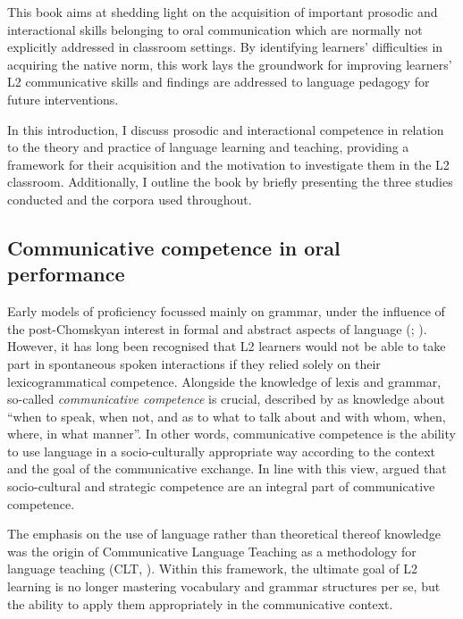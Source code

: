 This book aims at shedding light on the acquisition of important prosodic and interactional skills belonging to oral communication which are normally not explicitly addressed in classroom settings. By identifying learners’ difficulties in acquiring the native norm, this work lays the groundwork for improving learners’ L2 communicative skills and findings are addressed to language pedagogy for future interventions.

In this introduction, I discuss prosodic and interactional competence in relation to the theory and practice of language learning and teaching, providing a framework for their acquisition and the motivation to investigate them in the L2 classroom. Additionally, I outline the book by briefly presenting the three studies conducted and the corpora used throughout.

\subsection{Communicative competence in oral performance}
\hypertarget{Toc191305873}{}
Early models of proficiency focussed mainly on grammar, under the influence of the post-Chomskyan interest in formal and abstract aspects of language (\citealt{Campbell-Larsen2015}; \citealt{Kramsch1986}). However, it has long been recognised that L2 learners would not be able to take part in spontaneous spoken interactions if they relied solely on their lexicogrammatical competence. Alongside the knowledge of lexis and grammar, so-called \textit{communicative competence} is crucial, described by \citep[277]{Hymes1972} as knowledge about “when to speak, when not, and as to what to talk about and with whom, when, where, in what manner”. In other words, communicative competence is the ability to use language in a socio-culturally appropriate way according to the context and the goal of the communicative exchange. In line with this view, \citet{CanaleSwain1980} argued that socio-cultural and strategic competence are an integral part of communicative competence.

The emphasis on the use of language rather than theoretical thereof knowledge was the origin of Communicative Language Teaching as a methodology for language teaching (CLT, \citealt{Savignon1991}). Within this framework, the ultimate goal of L2 learning is no longer mastering vocabulary and grammar structures per se, but the ability to apply them appropriately in the communicative context.

